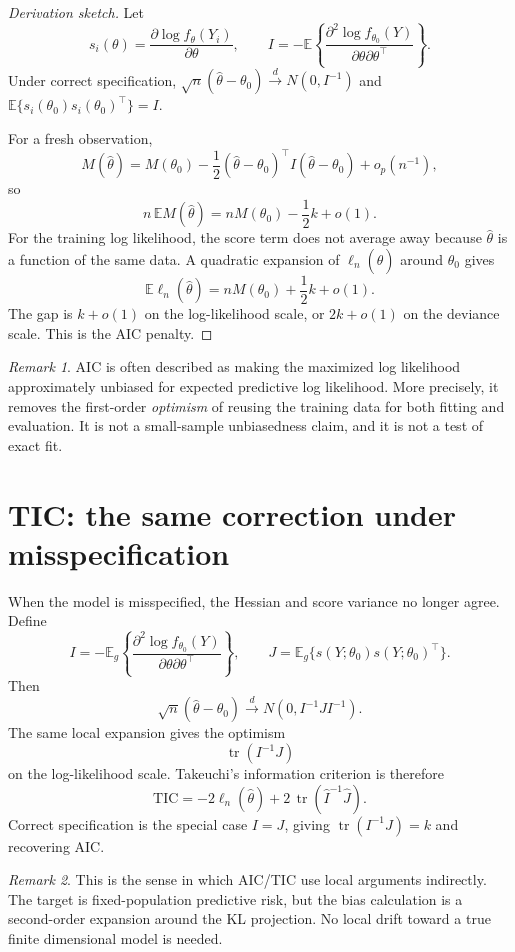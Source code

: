 \documentclass[11pt]{article}
\newcommand{\E}{\mathbb{E}}
\newcommand{\tr}{\operatorname{tr}}
\newcommand{\dto}{\xrightarrow{d}}
\theoremstyle{plain}
\theoremstyle{remark}
\newtheorem*{remark}{Remark}
\begin{document}
\begin{proof}[Derivation sketch]
Let
\[
  s_i(\theta)=\frac{\partial\log f_\theta(Y_i)}{\partial\theta},
  \qquad
  I=-\E\left\{
    \frac{\partial^2\log f_{\theta_0}(Y)}
         {\partial\theta\partial\theta^\top}
  \right\}.
\]
Under correct specification,
$\sqrt n(\hat\theta-\theta_0)\dto N(0,I^{-1})$ and
$\E\{s_i(\theta_0)s_i(\theta_0)^\top\}=I$.

For a fresh observation,
\[
  M(\hat\theta)
  =
  M(\theta_0)
  -\frac12(\hat\theta-\theta_0)^\top I(\hat\theta-\theta_0)
  +o_p(n^{-1}),
\]
so
\[
  n\,\E M(\hat\theta)=nM(\theta_0)-\frac12 k+o(1).
\]
For the training log likelihood, the score term does not average away because
$\hat\theta$ is a function of the same data. A quadratic expansion of
$\ell_n(\hat\theta)$ around $\theta_0$ gives
\[
  \E\ell_n(\hat\theta)=nM(\theta_0)+\frac12 k+o(1).
\]
The gap is $k+o(1)$ on the log-likelihood scale, or $2k+o(1)$ on the deviance
scale. This is the AIC penalty.
\end{proof}

\begin{remark}
AIC is often described as making the maximized log likelihood approximately
unbiased for expected predictive log likelihood. More precisely, it removes
the first-order \emph{optimism} of reusing the training data for both fitting
and evaluation. It is not a small-sample unbiasedness claim, and it is not a
test of exact fit.
\end{remark}

\section{TIC: the same correction under misspecification}

When the model is misspecified, the Hessian and score variance no longer agree.
Define
\[
  I = -\E_g\left\{\frac{\partial^2\log f_{\theta_0}(Y)}
    {\partial\theta\partial\theta^\top}\right\},
  \qquad
  J = \E_g\{s(Y;\theta_0)s(Y;\theta_0)^\top\}.
\]
Then
\[
  \sqrt n(\hat\theta-\theta_0)\dto N(0,I^{-1}JI^{-1}).
\]
The same local expansion gives the optimism
\[
  \tr(I^{-1}J)
\]
on the log-likelihood scale. Takeuchi's information criterion is therefore
\[
  \mathrm{TIC}
  =
  -2\ell_n(\hat\theta)
  +2\,\tr(\hat I^{-1}\hat J).
\]
Correct specification is the special case $I=J$, giving
$\tr(I^{-1}J)=k$ and recovering AIC.

\begin{remark}
This is the sense in which AIC/TIC use local arguments indirectly. The target is
fixed-population predictive risk, but the bias calculation is a second-order
expansion around the KL projection. No local drift toward a true finite
dimensional model is needed.
\end{remark}
\end{document}
